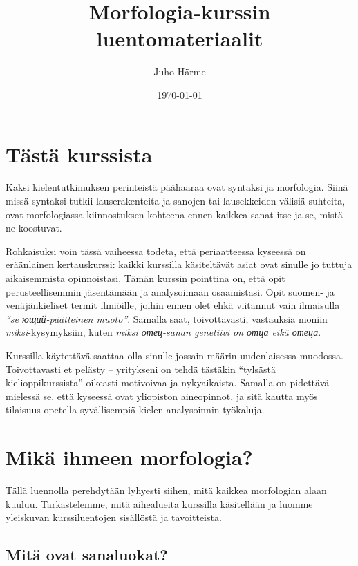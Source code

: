 \documentclass[]{scrreprt}
\author{Juho Härme}
\title{Morfologia-kurssin luentomateriaalit}
\date{\today}
\begin{document}
\maketitle
\tableofcontents
\newpage



\chapter*{Tästä kurssista}\label{tuxe4stuxe4-kurssista}

Kaksi kielentutkimuksen perinteistä päähaaraa ovat syntaksi ja
morfologia. Siinä missä syntaksi tutkii lauserakenteita ja sanojen tai
lausekkeiden välisiä suhteita, ovat morfologiassa kiinnostuksen kohteena
ennen kaikkea sanat itse ja se, mistä ne koostuvat.

Rohkaisuksi voin tässä vaiheessa todeta, että periaatteessa kyseessä on
eräänlainen kertauskurssi: kaikki kurssilla käsiteltävät asiat ovat
sinulle jo tuttuja aikaisemmista opinnoistasi. Tämän kurssin pointtina
on, että opit perusteellisemmin jäsentämään ja analysoimaan osaamistasi.
Opit suomen- ja venäjänkieliset termit ilmiöille, joihin ennen olet ehkä
viitannut vain ilmaisulla \emph{``se ющий-päätteinen muoto''}. Samalla
saat, toivottavasti, vastauksia moniin \emph{miksi}-kysymyksiin, kuten
\emph{miksi отец-sanan genetiivi on отца eikä отеца}.

Kurssilla käytettävä saattaa olla sinulle jossain määrin uudenlaisessa
muodossa. Toivottavasti et pelästy -- yritykseni on tehdä tästäkin
``tylsästä kielioppikurssista'' oikeasti motivoivaa ja nykyaikaista.
Samalla on pidettävä mielessä se, että kyseessä ovat yliopiston
aineopinnot, ja sitä kautta myös tilaisuus opetella syvällisempiä kielen
analysoinnin työkaluja.


\chapter{Mikä ihmeen morfologia?}\label{luento-1-mikuxe4-ihmeen-morfologia}


Tällä luennolla perehdytään lyhyesti siihen, mitä kaikkea morfologian
alaan kuuluu. Tarkastelemme, mitä aihealueita kurssilla käsitellään ja
luomme yleiskuvan kurssiluentojen sisällöstä ja tavoitteista.

\section{Mitä ovat sanaluokat?}\label{mituxe4-ovat-sanaluokat}
\end{document}
